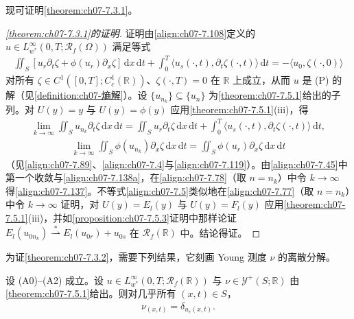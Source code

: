 \documentclass[../../main.tex]{subfiles}%
\begin{document}
现可证明\cref{theorem:ch07-7.3.1}。

\begin{proof}[\cref{theorem:ch07-7.3.1}的证明]
证明由\eqref{align:ch07-7.108}定义的 $u\in L^\infty_{w^*}(0,T;\mathscr{R}_f(\Omega))$ 满足等式
\begin{align}
\iint_S[u_r\partial_t\zeta+\phi(u_r)\partial_x\zeta]\,\mathrm{d}x\,\mathrm{d}t
+\int_0^T\langle u_s(\cdot,t),\partial_t\zeta(\cdot,t)\rangle\,\mathrm{d}t
=-\langle u_0,\zeta(\cdot,0)\rangle \label{align:ch07-7.137}
\end{align}
对所有 $\zeta\in C^1([0,T];C^1_c(\mathbb{R}))$、$\zeta(\cdot,T)=0$ 在 $\mathbb{R}$ 上成立，从而 $u$ 是 (P) 的解（见\cref{definition:ch07-熵解}）。设 $\{u_{n_k}\}\subseteq\{u_n\}$ 为\cref{theorem:ch07-7.5.1}给出的子列。对 $U(y)=y$ 与 $U(y)=\phi(y)$ 应用\cref{theorem:ch07-7.5.1}(iii)，得
\begin{align}
\lim_{k\to\infty}\iint_S u_{n_k}\partial_t\zeta\,\mathrm{d}x\,\mathrm{d}t
=\iint_S u_r\partial_t\zeta\,\mathrm{d}x\,\mathrm{d}t+\int_0^T\langle u_s(\cdot,t),\partial_t\zeta(\cdot,t)\rangle\,\mathrm{d}t, \label{align:ch07-7.138a}
\end{align}
\begin{align}
\lim_{k\to\infty}\iint_S\phi(u_{n_k})\partial_x\zeta\,\mathrm{d}x\,\mathrm{d}t
=\iint_S\phi(u_r)\partial_x\zeta\,\mathrm{d}x\,\mathrm{d}t \label{align:ch07-7.138b}
\end{align}
（见\eqref{align:ch07-7.89}、\eqref{align:ch07-7.4}与\eqref{align:ch07-7.119}）。由\eqref{align:ch07-7.45}中第一个收敛与\eqref{align:ch07-7.138a}，在\eqref{align:ch07-7.78}（取 $n=n_k$）中令 $k\to\infty$ 得\eqref{align:ch07-7.137}。不等式\eqref{align:ch07-7.5}类似地在\eqref{align:ch07-7.77}（取 $n=n_k$）中令 $k\to\infty$ 证明，对 $U(y)=E_l(y)$ 与 $U(y)=F_l(y)$ 应用\cref{theorem:ch07-7.5.1}(iii)，并如\cref{proposition:ch07-7.5.3}证明中那样论证 $E_l(u_{0n_k})\stackrel{*}{\rightharpoonup}E_l(u_{0r})+u_{0s}$ 在 $\mathscr{R}_f(\mathbb{R})$ 中。结论得证。
\end{proof}

为证\cref{theorem:ch07-7.3.2}，需要下列结果，它刻画 Young 测度 $\nu$ 的离散分解。

\begin{proposition}\label{proposition:ch07-7.5.7}
设 (A0)--(A2) 成立。设 $u\in L^\infty_{w^*}(0,T;\mathscr{R}_f(\mathbb{R}))$ 与 $\nu\in\mathcal{Y}^+(S;\mathbb{R})$ 由\cref{theorem:ch07-7.5.1}给出。则对几乎所有 $(x,t)\in S$，
\begin{align}
\nu_{(x,t)}=\delta_{u_r(x,t)}. \label{align:ch07-7.139}
\end{align}
\end{proposition}
\end{document}
